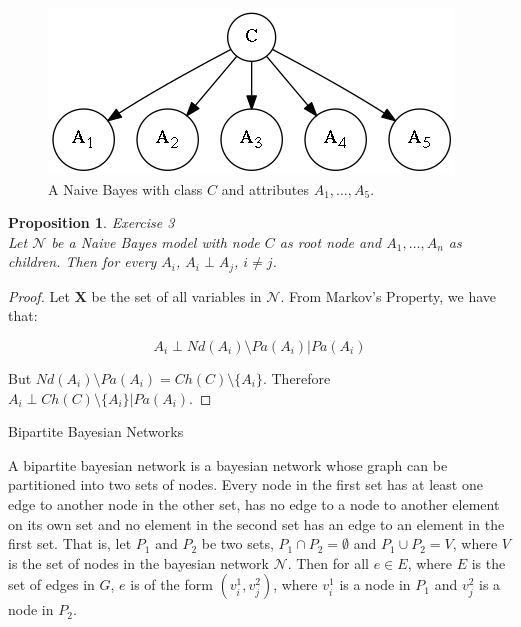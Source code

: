 \documentclass{amsart}
\makeatletter
\def\subsection{\@startsection{subsection}{3}%
  \z@{.5\linespacing\@plus.7\linespacing}{.1\linespacing}%
  {\normalfont\itshape}}
\theoremstyle{plain}
\newtheorem{proposition}{Proposition}
\makeatother
\begin{document}
\begin{figure}[h]
  \captionsetup{justification=centering}
  \centering\includegraphics[scale=0.5]{graphs/naive_bayes.png}
  \caption{A Naive Bayes with class $C$ and attributes $A_1,\ldots,A_5$.}
\end{figure}

\begin{proposition} Exercise 3\\
  Let $\mathcal{N}$ be a Naive Bayes model with node $C$ as root node and $A_1,\ldots,A_n$ as
  children. Then for every $A_i$, $A_i \perp A_j$, $i\neq j$.
\end{proposition}

\begin{proof}
  Let $\mathbf{X}$ be the set of all variables in $\mathcal{N}$. From Markov's Property, we have
  that:

  \begin{equation*}
    A_i \perp Nd(A_i)\setminus Pa(A_i) | Pa(A_i)
  \end{equation*}

  But $Nd(A_i)\setminus Pa(A_i)=Ch(C)\setminus \{A_i\}$. Therefore $A_i \perp Ch(C)\setminus
  \{A_i\}|Pa(A_i)$.
\end{proof}

\subsection{Bipartite Bayesian Networks}

A bipartite bayesian network is a bayesian network whose graph can be partitioned into two sets of
nodes. Every node in the first set has at least one edge to another node in the other set, has
no edge to a node to another element on its own set and no element in the second set has an edge
to an element in the first set. That is, let $P_1$ and $P_2$ be two sets, $P_1\cap P_2=\emptyset$
and $P_1\cup P_2=V$, where $V$ is the set of nodes in the bayesian network $\mathcal{N}$. Then for
all $e\in E$, where $E$ is the set of edges in $G$, $e$ is of the form $(v_i^1,v_j^2)$, where
$v_i^1$ is a node in $P_1$ and $v_j^2$ is a node in $P_2$.
\end{document}
